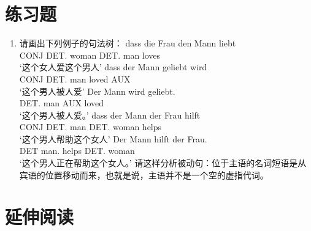 \section*{练习题}

\begin{enumerate}
\item 请画出下列例子的句法树：
\eal
\ex 
\gll dass die Frau den Mann liebt\\
     CONJ DET.\nom{} woman DET.\acc{} man loves\\
\glt `这个女人爱这个男人'
\ex 
\gll dass der Mann geliebt wird\\
     CONJ DET.\nom{} man loved AUX\\
\glt `这个男人被人爱'
\ex 
\gll Der Mann wird geliebt.\\
     DET.\nom{} man AUX loved\\
\glt `这个男人被人爱。'
\ex 
\gll dass der Mann der Frau hilft\\
     CONJ DET.\nom{} man DET.\dat{} woman helps\\
\glt `这个男人帮助这个女人'
\ex 
\gll Der Mann hilft der Frau.\\
     DET man.\nom{} helps DET.\dat{} woman\\
\glt `这个男人正在帮助这个女人。'
\zl
请这样分析被动句：位于主语的名词短语是从宾语的位置移动而来，也就是说，主语并不是一个空的虚指代词。
\end{enumerate}



\section*{延伸阅读}

